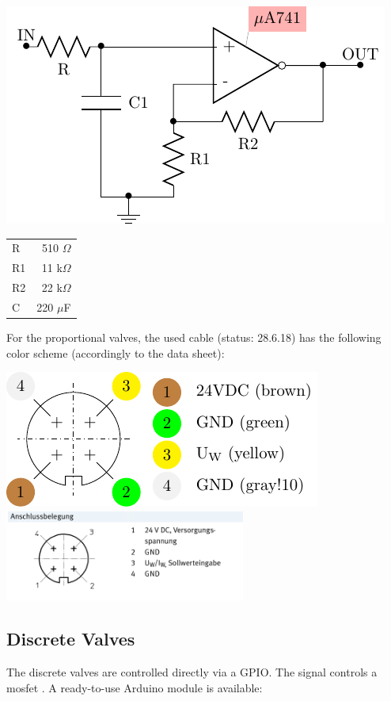 \documentclass[
	fontsize=10pt
	paper=a4
]{scrartcl}
\begin{document}
\includegraphics[scale=1]{Images/Mpye/mpye_simplified_scheme.pdf}
\begin{tabular}{lr}
R & 510 $\Omega$ \\
R1 & 11 k$\Omega$ \\
R2 & 22 k$\Omega$ \\
C & 220 $\mu$F
\end{tabular}

For the proportional valves, the used cable (status: 28.6.18) has the following color scheme (accordingly to the data sheet\cite[p. 9]{MPYE_DATASHEET}):


\includegraphics[scale=1]{Images/Mpye/anschluss_mpye_PIN.pdf}
\includegraphics[height=3cm]{Images/Mpye/PinOut.PNG}


\subsection{Discrete Valves}	
The discrete valves are controlled directly via a GPIO.
The signal controls a mosfet \cite{IRF540_DATASHEET}.
A ready-to-use Arduino module is available:
\end{document}
